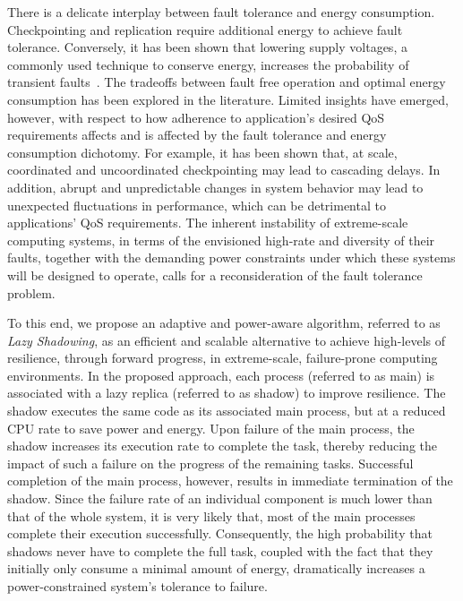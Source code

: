 There is a delicate interplay between fault tolerance and energy consumption. Checkpointing and replication require additional energy to achieve fault tolerance. Conversely, it has been shown that lowering supply voltages, a commonly used technique to conserve energy, increases the probability of transient faults~\cite{chandra2008defect}. The tradeoffs between fault free operation and optimal energy consumption has been explored in the literature. Limited insights have emerged, however, with respect to how adherence to application's desired QoS requirements affects and is affected by the fault tolerance and energy consumption dichotomy. For example, it has been shown that, at scale, coordinated and uncoordinated checkpointing may lead to cascading delays. %
In addition, abrupt and unpredictable changes in system behavior may lead to unexpected fluctuations in performance, which can be detrimental to applications' QoS requirements. The inherent instability of extreme-scale computing systems, in terms of the envisioned high-rate and diversity of their faults, together with the demanding power constraints under which these systems will be designed to operate, calls for a reconsideration of the fault tolerance problem.

To this end, we propose an adaptive and power-aware algorithm, referred to as \textit{Lazy
Shadowing}, as an efficient and scalable alternative to achieve high-levels of resilience, through
forward progress, in extreme-scale, failure-prone computing environments. In the proposed
approach, each process (referred to as main) is associated with a lazy replica (referred to as shadow) to improve resilience. The shadow executes the same code as its
associated main process, but at a reduced CPU rate to save power and energy. %
Upon failure of the main process, the shadow increases its 
execution rate to complete the task, thereby reducing the impact of such a failure on the progress of
the remaining tasks. Successful completion of the main process, however, results in immediate
termination of the shadow. Since the failure rate of an individual component is much lower than that of 
the whole system, it is very likely that, most of the main processes complete their execution
successfully. %
Consequently, the high probability that shadows never have to complete the full task, coupled with the fact that 
they initially only consume a minimal amount of energy, 
dramatically increases a power-constrained system's tolerance to failure.

